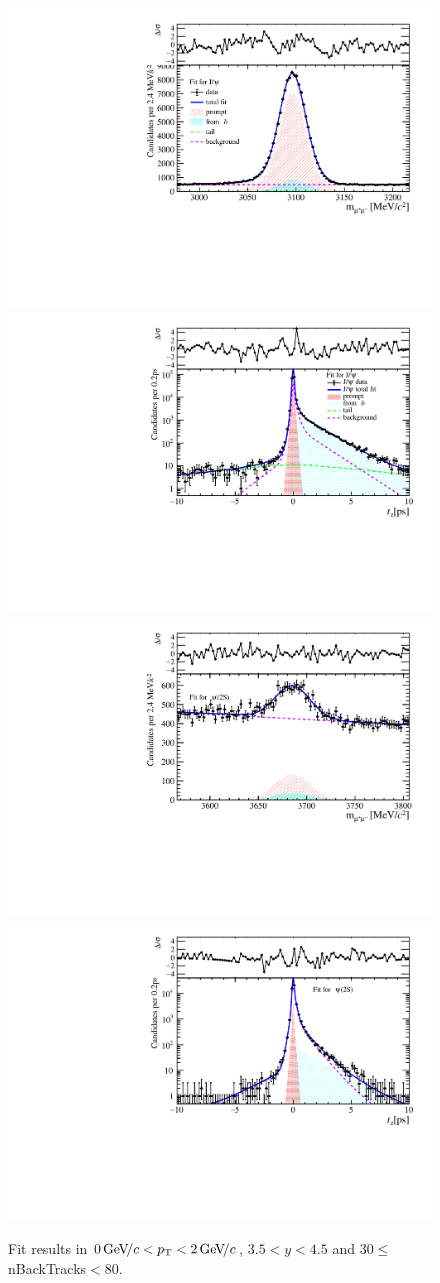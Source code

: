 \begin{figure}[H]
\begin{center}
\includegraphics[width=0.47\linewidth]{pdf/Jpsi/drawmassB/n5y3pt1.pdf}
\includegraphics[width=0.47\linewidth]{pdf/Jpsi/2DFitB/n5y3pt1.pdf}
\vspace*{-0.5cm}
\includegraphics[width=0.47\linewidth]{pdf/Psi2S/drawmassB/n5y3pt1.pdf}
\includegraphics[width=0.47\linewidth]{pdf/Psi2S/2DFitB/n5y3pt1.pdf}
\vspace*{-0.5cm}
\end{center}
\caption{Fit results in $0\text{\,Ge\kern -0.1em V\!/}c<p_{\mathrm{T}}<2\text{\,Ge\kern -0.1em V\!/}c$, $3.5<y<4.5$ and 30$\leq$nBackTracks$<$80.}
\label{Fitn5y3pt1}
\end{figure}
